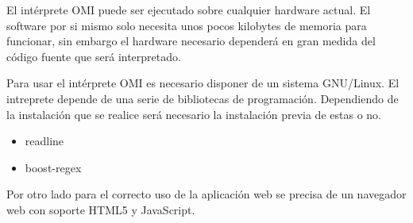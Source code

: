 El intérprete OMI puede ser ejecutado sobre cualquier hardware actual. El software por si mismo
solo necesita unos pocos kilobytes de memoria para funcionar, sin embargo el hardware 
necesario dependerá en gran medida del código fuente que será interpretado.

Para usar el intérprete OMI es necesario disponer de un sistema GNU/Linux. 
El intreprete depende de una serie de bibliotecas de programación. Dependiendo 
de la instalación que se realice será necesario la instalación previa de estas o no.

\begin{itemize}
\item readline
\item boost-regex
\end{itemize}

Por otro lado para el correcto uso de la aplicación web se precisa de un navegador web con soporte 
HTML5 y JavaScript.
